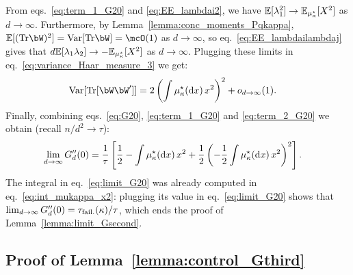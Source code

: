 From eqs.~\eqref{eq:term_1_G20} and \eqref{eq:EE_lambdai2}, we have $\mathbb{E}[\lambda_1^2] \to \mathbb{E}_{\mu_\kappa^\star}[X^2]$ as $d \to \infty$.
Furthermore, by Lemma~\ref{lemma:conc_moments_Pqkappa}, $\EE[(\Tr \bW)^2] = \Var[\Tr \bW] = \mcO(1)$ as $d \to \infty$, 
so eq.~\eqref{eq:EE_lambdailambdaj} gives that $d \mathbb{E}[\lambda_1 \lambda_2] \to - \mathbb{E}_{\mu_\kappa^\star}[X^2]$ as $d \to \infty$.
Plugging these limits in eq.~\eqref{eq:variance_Haar_measure_3} we get:
\begin{align}\label{eq:term_2_G20}
   \textrm{Var}[\Tr[\bW \bW']] &= 2 \left(\int \mu_\kappa^\star(\rd x) \, x^2 \right)^2 + \smallO_{d\to \infty}(1).
\end{align}
Finally, combining eqs.~\eqref{eq:G20}, \eqref{eq:term_1_G20} and \eqref{eq:term_2_G20} we obtain (recall $n/d^2 \to \tau$):
\begin{align}\label{eq:limit_G20}
    \lim_{d \to \infty} G_d''(0) &= \frac{1}{\tau} \left[\frac{1}{2} - \int \mu_\kappa^\star(\mathrm{d} x) \, x^2 + \frac{1}{2}\left(- \frac{1}{2} \int \mu_\kappa^\star(\mathrm{d} x) \, x^2\right)^2 \right].
\end{align}
The integral in eq.~\eqref{eq:limit_G20} was already computed in eq.~\eqref{eq:int_mukappa_x2}: plugging its value in eq.~\eqref{eq:limit_G20} 
shows that $  \lim_{d \to \infty} G_d''(0) = \tau_{\rm fail.}(\kappa)/\tau$, which ends the proof of Lemma~\ref{lemma:limit_Gsecond}.

\subsection{Proof of Lemma~\ref{lemma:control_Gthird}}\label{subsec:proof_control_Gthird}

